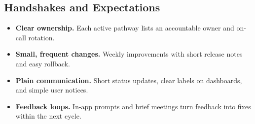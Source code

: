 \documentclass[12pt]{article}
\begin{document}
\subsection*{Handshakes and Expectations}
\begin{itemize}[leftmargin=*]
  \item \textbf{Clear ownership.} Each active pathway lists an accountable owner and on-call rotation.
  \item \textbf{Small, frequent changes.} Weekly improvements with short release notes and easy rollback.
  \item \textbf{Plain communication.} Short status updates, clear labels on dashboards, and simple user notices.
  \item \textbf{Feedback loops.} In-app prompts and brief meetings turn feedback into fixes within the next cycle.
\end{itemize}

\end{document}
